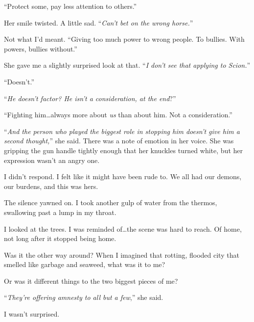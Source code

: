 ``Protect some, pay less attention to others.''



Her smile twisted.  A little sad.  ``\emph{Can't bet on the wrong horse.}''



Not what I'd meant.  ``Giving too much power to wrong people.  To bullies.  With powers, bullies without.''



She gave me a slightly surprised look at that.  ``\emph{I don't see that applying to Scion.}''



``Doesn't.''



``\emph{He doesn't factor?  He isn't a consideration, at the end}?''



``Fighting him\ldots always more about \emph{us} than about him.  Not a consideration.''



``\emph{And the person who played the biggest role in stopping him doesn't give him a second thought,}'' she said.  There was a note of emotion in her voice.  She was gripping the gun handle tightly enough that her knuckles turned white, but her expression wasn't an angry one.



I didn't respond.  I felt like it might have been rude to.  We all had our demons, our burdens, and this was hers.



The silence yawned on.  I took another gulp of water from the thermos, swallowing past a lump in my throat.



I looked at the trees.  I was reminded of\ldots the scene was hard to reach.  Of home, not long after it stopped being home.



Was it the other way around?  When I imagined that rotting, flooded city that smelled like garbage and seaweed, what was it to me?



Or was it different things to the two biggest pieces of me?



``\emph{They're offering amnesty to all but a few},'' she said.



I wasn't surprised.



